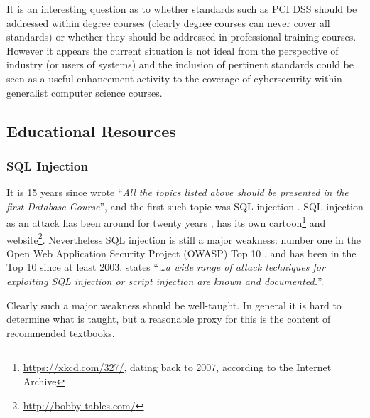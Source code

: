 \documentclass[conference]{IEEEtran}
\begin{document}
It is an interesting question as to whether standards such as PCI DSS should be addressed within degree courses (clearly degree courses can never cover all standards) or whether they should be addressed in professional training courses. However it appears the current situation is not ideal from the perspective of industry (or users of systems) and the inclusion of pertinent standards could be seen as a useful enhancement activity to the coverage of cybersecurity within generalist %
computer science courses.

\subsection{Educational Resources}\label{sec:EDResource}

\subsubsection{SQL Injection}\label{sec:SQL}

It is 15 years since \cite{Guimaraesetal2004} 
wrote ``{\emph{All the topics listed above should be presented in the first
Database Course}}'', and the first such topic was SQL injection \cite{SPIDynamics2002,Anonymous2018b}. SQL injection as an attack has been around for twenty years \cite{HornerHyslip2017a}, has its own cartoon\footnote{\url{https://xkcd.com/327/}, dating back to 2007, according to the Internet Archive} and website\footnote{\url{http://bobby-tables.com/}}. Nevertheless SQL injection is still a major weakness: number one in the Open Web Application Security Project (OWASP) Top 10 \cite{OWASP2017a}, and has been in the Top 10 since at least 2003.  \cite[the UK's definitive reference]{Bristol2018a} states ``{\emph{\ldots a wide range of attack techniques for exploiting SQL
injection or script injection are known and documented.}}''.

Clearly such a major weakness should be well-taught.  In general it is hard to determine what is taught, but a reasonable proxy for this is the content of recommended textbooks. 
\end{document}
